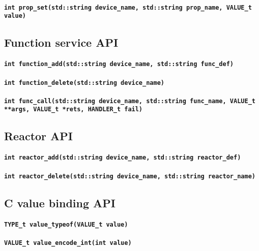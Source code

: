 \documentclass{note}
\begin{document}
\paragraph{\small\textcolor{red2}{\tt{}int prop\_set(std::string device\_name, std::string prop\_name, VALUE\_t value)}}


\subsection{Function service API}
\paragraph{\small\textcolor{red2}{\tt{}int function\_add(std::string device\_name, std::string func\_def)}}
\paragraph{\small\textcolor{red2}{\tt{}int function\_delete(std::string device\_name)}}
\paragraph{\small\textcolor{red2}{\tt{}int func\_call(std::string device\_name, std::string func\_name, VALUE\_t **args, VALUE\_t *rets, HANDLER\_t fail)}}

\subsection{Reactor API}
\paragraph{\small\textcolor{red2}{\tt{}int reactor\_add(std::string device\_name, std::string reactor\_def)}}
\paragraph{\small\textcolor{red2}{\tt{}int reactor\_delete(std::string device\_name, std::string reactor\_name)}}

\subsection{C value binding API}
\paragraph{\small\textcolor{red2}{\tt{}TYPE\_t value\_typeof(VALUE\_t value)}}
\paragraph{\small\textcolor{red2}{\tt{}VALUE\_t value\_encode\_int(int value)}}
\end{document}
